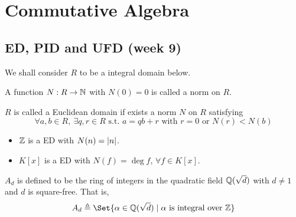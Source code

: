 \section{Commutative Algebra}

\subsection{ED, PID and UFD (week 9)}

We shall consider $R$ to be a integral domain below.
\begin{definition}
  A function $N: R \to \mathbb{N}$ with $N(0) = 0$ is called a norm on $R$.
\end{definition}

\begin{definition}
  $R$ is called a Euclidean domain if exists a norm $N$ on $R$
  satisfying
  \[ \forall a, b \in R, \ \exists q, r \in R \text{ s.t. }
  a = qb + r \text{ with } r = 0 \text{ or } N(r) < N(b) \]
\end{definition}

\begin{example} \hfill
  \begin{itemize}
    \item $\mathbb{Z}$ is a ED with $N(n) = \lvert n\rvert$.
    \item $K[x]$ is a ED with $N(f) = \deg f, \, \forall f \in K[x]$.
  \end{itemize}
\end{example}

\begin{definition}
  $A_d$ is defined to be the ring of integers in the quadratic field $\mathbb{Q}(\sqrt{d})$
  with $d \neq 1$ and $d$ is square-free. That is,
  \[ A_d \triangleq \Set{ \alpha \in \Qb(\sqrt{d}) \mid \alpha \text{ is integral over } \Zb} \]
\end{definition}

